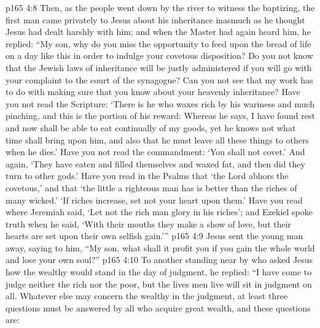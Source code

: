 \vs p165 4:8 \pc Then, as the people went down by the river to witness the baptizing, the first man came privately to Jesus about his inheritance inasmuch as he thought Jesus had dealt harshly with him; and when the Master had again heard him, he replied: “My son, why do you miss the opportunity to feed upon the bread of life on a day like this in order to indulge your covetous disposition? Do you not know that the Jewish laws of inheritance will be justly administered if you will go with your complaint to the court of the synagogue? Can you not see that my work has to do with making sure that you know about your heavenly inheritance? Have you not read the Scripture: ‘There is he who waxes rich by his wariness and much pinching, and this is the portion of his reward: Whereas he says, I have found rest and now shall be able to eat continually of my goods, yet he knows not what time shall bring upon him, and also that he must leave all these things to others when he dies.’ Have you not read the commandment: ‘You shall not covet.’ And again, ‘They have eaten and filled themselves and waxed fat, and then did they turn to other gods.’ Have you read in the Psalms that ‘the Lord abhors the covetous,’ and that ‘the little a righteous man has is better than the riches of many wicked.’ ‘If riches increase, set not your heart upon them.’ Have you read where Jeremiah said, ‘Let not the rich man glory in his riches’; and Ezekiel spoke truth when he said, ‘With their mouths they make a show of love, but their hearts are set upon their own selfish gain.’”
\vs p165 4:9 Jesus sent the young man away, saying to him, \textcolor{ubdarkred}{“My son, what shall it profit you if you gain the whole world and lose your own soul?”}
\vs p165 4:10 To another standing near by who asked Jesus how the wealthy would stand in the day of judgment, he replied: \textcolor{ubdarkred}{“I have come to judge neither the rich nor the poor, but the lives men live will sit in judgment on all. Whatever else may concern the wealthy in the judgment, at least three questions must be answered by all who acquire great wealth, and these questions are:}

